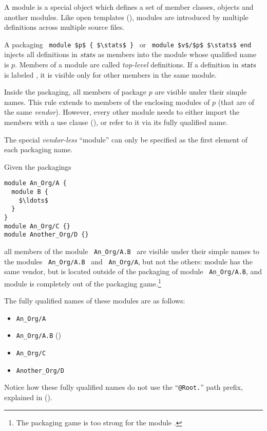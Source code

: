 A module is a special object which defines a set of member classes, objects and another modules. Like open templates (), modules are introduced by multiple definitions across multiple source files.  

A packaging ~\lstinline!module $p$ { $\stats$ }!~ or ~\lstinline!module $v$/$p$ $\stats$ end!~ injects all definitions in $\mbox{\sl stats}$ as members into the module whose qualified name is $p$. Members of a module are called {\em top-level} definitions. If a definition in $\mbox{\sl stats}$ is labeled , it is visible only for other members in the same module. 

Inside the packaging, all members of package $p$ are visible under their simple names. This rule extends to members of the enclosing modules of $p$ (that are of the same {\em vendor}). However, every other module needs to either import the members with a use clause (), or refer to it via its fully qualified name. 

The special {\em vendor-less}  ``module'' can only be specified as the first element of each packaging name. 

\example Given the packagings
\begin{lstlisting}
module An_Org/A {
  module B {
    $\ldots$
  }
}
module An_Org/C {}
module Another_Org/D {}
\end{lstlisting}
all members of the module ~\lstinline!An_Org/A.B!~ are visible under their simple names to the modules ~\lstinline!An_Org/A.B!~ and ~\lstinline!An_Org/A!, but not the others: module  has the same vendor, but is located outside of the packaging of module ~\lstinline!An_Org/A.B!, and module  is completely out of the packaging game.\footnote{The packaging game is too strong for the module .} 

The fully qualified names of these modules are as follows: 
\begin{itemize}
\item \lstinline!An_Org/A!
\item \lstinline!An_Org/A.B! ()
\item \lstinline!An_Org/C!
\item \lstinline!Another_Org/D!
\end{itemize}

Notice how these fully qualified names do not use the ``\lstinline!@Root.!'' path prefix, explained in ().

